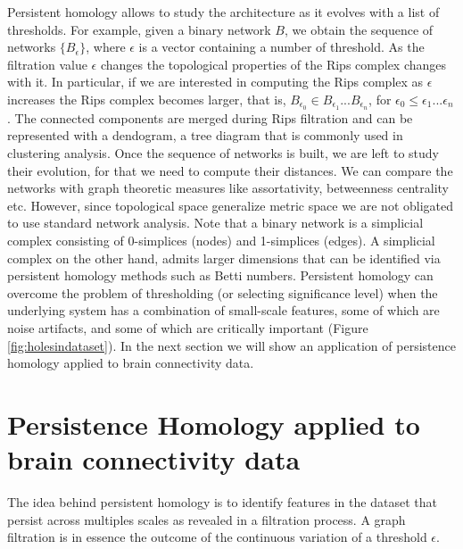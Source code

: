 \documentclass[onecollarge,runningheads]{svjour2}
\begin{document}
Persistent homology allows to study the architecture as it evolves with a list of thresholds. For example, given a binary network $B$, we obtain the sequence of networks $\{B_{\epsilon}\}$, where $\epsilon$ is a vector containing a number of threshold. As the filtration value $\epsilon$ changes the topological properties of the Rips complex changes with it. In particular, if we are interested in computing the Rips complex as $\epsilon$ increases the Rips complex becomes larger, that is, $B_{\epsilon_0} \in B_{\epsilon_1} ... B_{\epsilon_n}$, for $\epsilon_0 \leq \epsilon_1 ...\epsilon_n$. 
The connected components are merged during Rips filtration and can be represented with a dendogram, a tree diagram that is commonly used in clustering analysis.
Once the sequence of networks is built, we are left to study their evolution, for that we need to compute their distances. We can compare the networks with graph theoretic measures like assortativity, betweenness centrality etc. However, since topological space generalize metric space we are not obligated to 
use standard network analysis. Note that a binary network is a simplicial complex consisting of 0-simplices (nodes) and 1-simplices (edges). A simplicial complex on the other hand, admits larger dimensions that can be identified via persistent homology methods such as Betti numbers. 
Persistent homology can overcome the problem of thresholding (or selecting significance level) when the underlying system has a combination of small-scale features, some of which are noise artifacts, and some of which are critically important (Figure \ref{fig:holesindataset}). In the next section we will show an application of persistence homology applied to brain connectivity data. 


\section{Persistence Homology applied to brain connectivity data}
\label{se:exa}

The idea behind persistent homology is to identify features in the dataset that persist across multiples scales as revealed in a filtration process. A graph filtration is in essence the outcome of the continuous variation of a threshold $\epsilon$. 
\end{document}
